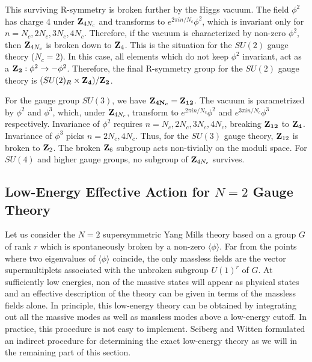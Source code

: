 This surviving R-symmetry is broken further by the Higgs vacuum. 
The field $\phi^2$ has charge 4 under ${\bf Z}_{4N_c}$ and transforms
to $e^{2\pi i n/N_c}\phi^2$, which is invariant only for
$n=N_c,2N_c,3N_c,4N_c$. Therefore, if the vacuum is characterized by
non-zero $\phi^2$, then ${\bf Z}_{4N_c}$ is broken down to ${\bf
  Z}_4$. This is the situation for the $SU(2)$ gauge theory ($N_c=2$). 
In this case, all elements which do not keep $\phi^2$ invariant, act
as a ${\bf Z_2}: \phi^2\rightarrow -\phi^2$. Therefore, the final
R-symmetry group for the $SU(2)$ gauge theory is $(SU(2)_R\times 
{\bf Z_4})/{\bf Z_2}$. 

For the gauge group $SU(3)$, we have ${\bf Z_{4N_c}}={\bf Z_{12}}$.
The vacuum is parametrized by $\phi^2$ and $\phi^3$, which, under
${\bf Z}_{4N_c}$, transform to $e^{2\pi i n/N_c}\phi^2$ and $e^{3\pi i
n/N_c}\phi^3$ respectively. Invariance of $\phi^2$ requires
$n=N_c,2N_c,3N_c,4N_c$, breaking ${\bf Z_{12}}$ to ${\bf
Z_{4}}$. Invariance of $\phi^3$ picks $n=2N_c, 4N_c$. Thus, for the
$SU(3)$ gauge theory, ${\bf Z}_{12}$ is broken to ${\bf Z}_2$. The
broken ${\bf Z}_6$ subgroup acts non-tivially on the moduli space. For
$SU(4)$ and higher gauge groups, no subgroup of ${\bf Z}_{4N_c}$
survives.

\subsection{Low-Energy Effective Action for $N=2$ Gauge Theory}

Let us consider the $N=2$ supersymmetric Yang Mills theory based on a
group $G$ of rank $r$ which is spontaneously broken by a non-zero
$\langle\phi\rangle$. Far from the points where two eigenvalues of
$\langle\phi\rangle$ coincide, the only massless fields are the vector
supermultiplets associated with the unbroken subgroup $U(1)^{r}$ of
$G$. At sufficiently low energies, non of the massive states will
appear as physical states and an effective description of the theory
can be given in terms of the massless fields alone. In principle, this
low-energy theory can be obtained by integrating out all the massive
modes as well as massless modes above a low-energy cutoff. In
practice, this procedure is not easy to implement. Seiberg and Witten
formulated an indirect procedure for determining the exact low-energy
theory as we will in the remaining part of this section.

